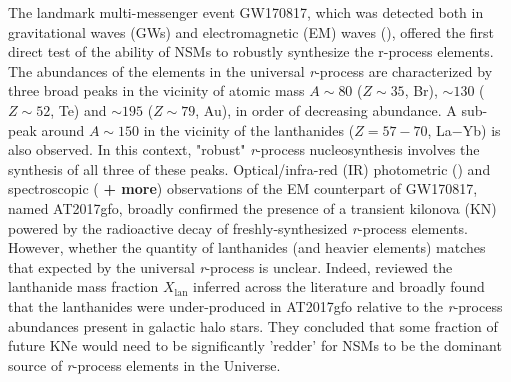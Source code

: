 \documentclass[twocolumn]{aastex63}
\begin{document}
The landmark multi-messenger event GW170817, which was detected both in gravitational waves (GWs) and electromagnetic (EM) waves (\citealt{abbottLIGO17a}), offered the first direct test of the ability of NSMs to robustly synthesize the r-process elements. The abundances of the elements in the universal \textit{r}-process are characterized by three broad peaks in the vicinity of atomic mass $A\sim80$ ($Z\sim35$, Br), $\sim130$ ($Z\sim52$, Te) and $\sim195$ ($Z\sim79$, Au), in order of decreasing abundance. A sub-peak around $A\sim150$ in the vicinity of the lanthanides ($Z=57-70$, La$-$Yb) is also observed. In this context, "robust" \textit{r}-process nucleosynthesis involves the synthesis of all three of these peaks. Optical/infra-red (IR) photometric (\citealt{andreoni17, arcavi17, coulter17, diaz17, drout17, evans17, hu17, kasliwal17, lipunov17, shappee17, tanvir17, troja17, utsumi17, valenti17}) and spectroscopic (\citealt{chornock17, kasen17, pian17, smartt17, cote18} \textbf{+ more}) observations of the EM counterpart of GW170817, named AT2017gfo, broadly confirmed the presence of a transient kilonova (KN) powered by the radioactive decay of freshly-synthesized \textit{r}-process elements. However, whether the quantity of lanthanides (and heavier elements) matches that expected by the universal \textit{r}-process is unclear. Indeed, \cite{ji19} reviewed the lanthanide mass fraction $X_{\mathrm{lan}}$ inferred across the literature and broadly found that the lanthanides were under-produced in AT2017gfo relative to the \textit{r}-process abundances present in galactic halo stars. They concluded that some fraction of future KNe would need to be significantly 'redder' for NSMs to be the dominant source of \textit{r}-process elements in the Universe. 
\end{document}
